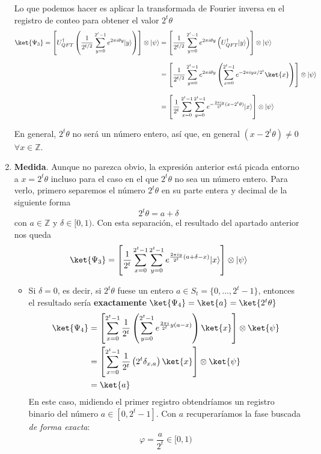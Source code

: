 \documentclass[a4paper,11pt]{book} %
\numberwithin{equation}{chapter}
\def\lp{\left(}
\def\rp{\right)}
\def\lc{\left[}
\def\rc{\right]}
\begin{document}
\begin{enumerate}
Lo que podemos hacer es aplicar la transformada de Fourier inversa en el registro de conteo para obtener el valor $2^t \theta$
	\begin{align*}
	\ket{\Psi_3} = \lc U_{QFT}^\dagger \lp \frac{1}{2^{t/2}}\sum_{y=0}^{2^{t}-1}e^{{2\pi i} \theta y}|y\rangle \rp \rc \otimes \vert\psi\rangle & =  \lc \frac{1}{2^{t/2}}\sum_{y=0}^{2^{t}-1}e^{{2\pi i} \theta y} \left( U^\dagger_{QFT}|y\rangle \right) \rc \otimes \vert\psi\rangle \\ \rule{0mm}{10mm}
	& = \lc \frac{1}{2^{t/2}}\sum_{y=0}^{2^{t}-1}e^{{2\pi i} \theta y} \left( \sum^{2^t-1}_{x=0} e^{-2 \pi i y x /2^t} \ket{x} \right) \rc \otimes \vert\psi\rangle \\ \rule{0mm}{10mm}
	& = \lc \frac{1}{2^{t}} \sum_{x=0}^{2^t-1} \sum_{y=0}^{2^{t}-1}e^{-\frac{2 \pi i y}{2^t} (x-2^t \theta)} |x\rangle \rc \otimes \vert\psi\rangle
	\end{align*}

En general, $2^t \theta$ no será un número entero, así que, en general $(x-2^t \theta) \neq  0$ $\forall x \in \mathbb{Z}$.

	\item \textbf{Medida}. Aunque no parezca obvio, la expresión anterior está picada entorno a $x = 2^t \theta$ incluso para el caso en el que $2^t \theta$ no sea un número entero. Para verlo, primero separemos el número $2^t \theta$ en su parte entera y decimal de la siguiente forma
	\begin{equation*}
	2^t \theta = a + \delta
 	\end{equation*} 
con $a \in \mathbb{Z}$ y $\delta \in [0,1)$. Con esta separación, el resultado del apartado anterior nos queda
	\begin{equation} \label{ec_QPE_Psi3_2}
	\ket{\Psi_3} = \lc \frac{1}{2^{t}} \sum_{x=0}^{2^t-1} \sum_{y=0}^{2^{t}-1}e^{\frac{2 \pi i y}{2^t} (a+\delta -x )} |x\rangle \rc \otimes \vert\psi\rangle
	\end{equation}

	\begin{itemize}
		\item Si $\delta = 0$, es decir, si $2^t \theta$ fuese un entero $a \in S_t = \{ 0, \dots, 2^t-1 \}$, entonces el resultado sería \textbf{exactamente} $\ket{\Psi_4} = \ket{a} = \ket{2^t \theta}$
			\begin{align*}
			\ket{\Psi_4} & = \lc \sum_{x=0}^{2^t-1} \frac{1}{2^t} \lp \sum^{2^t-1}_{y = 0} e^{\frac{2 \pi i}{2^t} y (a-x)} \rp \ket{x} \rc \otimes \ket{\psi} \\
			& = \lc \sum_{x=0}^{2^t-1} \frac{1}{2^t} \lp 2^t \delta_{x,a} \rp \ket{x} \rc \otimes \ket{\psi} \\
			& = \ket{a}
			\end{align*}
		En este caso, midiendo el primer registro obtendríamos un registro binario del número $a\in[0, 2^t-1]$. Con $a$ recuperaríamos la fase buscada \textit{de forma exacta}:
		$$
		\varphi = \frac{a}{2^t}  \in [0,1)
		$$ 
		

\end{itemize}
\end{enumerate}
\end{document}
